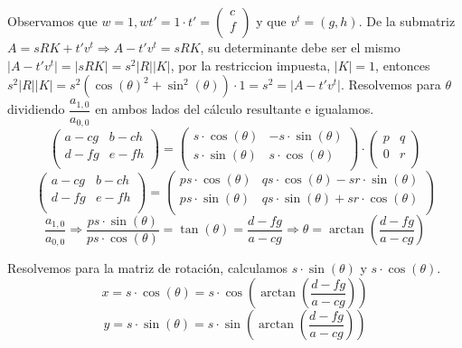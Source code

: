 \documentclass[12pt,a4paper]{article}
\begin{document}
	Observamos que $w = 1, wt' = 1\cdot t'=\begin{pmatrix}
	c\\
	f\\
	\end{pmatrix}$ y que $v^t=(g, h)$.
	\newline
	De la submatriz $A=sRK+t'v^t\Rightarrow A-t'v^t=sRK$, su determinante debe ser el mismo $\vert A - t'v^t\vert=\vert sRK\vert=s^2\vert R\vert \vert K \vert$, por la restriccion impuesta, $\vert K \vert = 1$, entonces $s^2\vert R\vert \vert K \vert = s^2 (\cos(\theta)^2+\sin^2(\theta))\cdot 1=s^2=\vert A - t'v^t\vert$.\newline
	Resolvemos para $\theta$ dividiendo $\dfrac{a_{1,0}}{a_{0,0}}$ en ambos lados del cálculo resultante e igualamos.
	$$ \begin{pmatrix}
	a-cg & b-ch\\
	d-fg & e-fh\\
	\end{pmatrix}=\begin{pmatrix}
	s\cdot\cos(\theta) & -s\cdot\sin(\theta)\\
	s\cdot\sin(\theta) & s\cdot\cos(\theta)\\
	\end{pmatrix}\cdot \begin{pmatrix}
	p & q\\
	0 & r\\
	\end{pmatrix}$$
	$$\begin{pmatrix}
	a-cg & b-ch\\
	d-fg & e-fh\\
	\end{pmatrix}=\begin{pmatrix}
	ps\cdot\cos(\theta) & qs\cdot\cos(\theta) -sr \cdot\sin(\theta)\\
	ps\cdot\sin(\theta) & qs\cdot\sin(\theta)+sr \cdot\cos(\theta)\\
	\end{pmatrix}$$
	$$\dfrac{a_{1,0}}{a_{0,0}}\Rightarrow \dfrac{ps\cdot \sin(\theta)}{ps\cdot\cos(\theta)}=\tan(\theta)=\dfrac{d-fg}{a-cg}\Rightarrow \theta=\arctan\left(\dfrac{d-fg}{a-cg}\right)$$
	
	Resolvemos para la matriz de rotación, calculamos $s\cdot \sin(\theta)$ y $s\cdot \cos(\theta)$.
	$$
		x=s\cdot\cos(\theta)=s\cdot\cos\left(\arctan\left(\dfrac{d-fg}{a-cg}\right)\right)
	$$
	$$
		y=s\cdot\sin(\theta)=s\cdot\sin\left(\arctan\left(\dfrac{d-fg}{a-cg}\right)\right)
	$$
	
\end{document}
